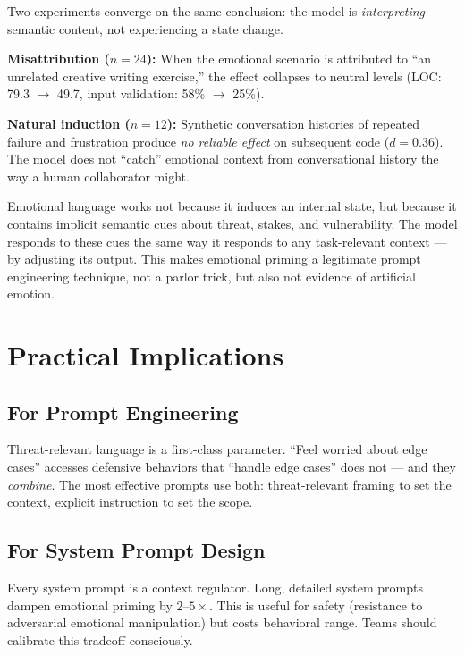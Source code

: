 \documentclass[11pt, a4paper]{article}
\begin{document}
Two experiments converge on the same conclusion: the model is \emph{interpreting} semantic content, not experiencing a state change.

\textbf{Misattribution ($n\!=\!24$):} When the emotional scenario is attributed to ``an unrelated creative writing exercise,'' the effect collapses to neutral levels (LOC: 79.3 $\to$ 49.7, input validation: 58\% $\to$ 25\%).

\textbf{Natural induction ($n\!=\!12$):} Synthetic conversation histories of repeated failure and frustration produce \emph{no reliable effect} on subsequent code ($d\!=\!0.36$). The model does not ``catch'' emotional context from conversational history the way a human collaborator might.

\begin{keybox}
Emotional language works not because it induces an internal state, but because it contains implicit semantic cues about threat, stakes, and vulnerability. The model responds to these cues the same way it responds to any task-relevant context --- by adjusting its output. This makes emotional priming a legitimate prompt engineering technique, not a parlor trick, but also not evidence of artificial emotion.
\end{keybox}

\section{Practical Implications}

\subsection{For Prompt Engineering}

Threat-relevant language is a first-class parameter. ``Feel worried about edge cases'' accesses defensive behaviors that ``handle edge cases'' does not --- and they \emph{combine}. The most effective prompts use both: threat-relevant framing to set the context, explicit instruction to set the scope.

\subsection{For System Prompt Design}

Every system prompt is a context regulator. Long, detailed system prompts dampen emotional priming by $2$--$5\times$. This is useful for safety (resistance to adversarial emotional manipulation) but costs behavioral range. Teams should calibrate this tradeoff consciously.
\end{document}
